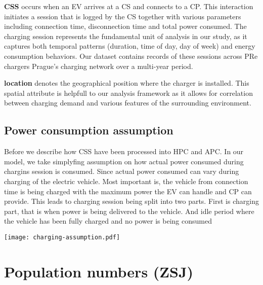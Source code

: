 \textbf{\acrlong{CSS}} occurs when an \acrshort{EV} arrives at a \acrshort{CS} and connects to a \acrshort{CP}. This interaction initiates a session that is logged by the \acrshort{CS} together with various parameters including connection time, disconnection time and total power consumed. The charging session represents the fundamental unit of analysis in our study, as it captures both temporal patterns (duration, time of day, day of week) and energy consumption behaviors. Our dataset contains records of these sessions across PRe chargers Prague's charging network over a multi-year period.

\textbf{location} denotes the geographical position where the charger is installed. This spatial attribute is helpfull to our analysis framework as it allows for correlation between charging demand and various features of the surrounding environment.

\subsection{Power consumption assumption}

Before we describe how \acrfull{CSS} have been processed into \acrlong{HPC} and \acrlong{APC}. In our model, we take simplyfing assumption on how actual power consumed during chargins session is consumed. Since actual power consumed can vary during charging of the electric vehicle. Most important is, the vehicle from connection time is being charged with the maximum power the \acrlong{EV} can handle and \acrlong{CP} can provide. This leads to charging session being split into two parts. First is charging part, that is when power is being delivered to the vehicle. And idle period where the vehicle has been fully charged and no power is being consumed



\begin{marginfigure}
    \texttt{[image: charging-assumption.pdf]}
\end{marginfigure}

\section{Population numbers (ZSJ)}

